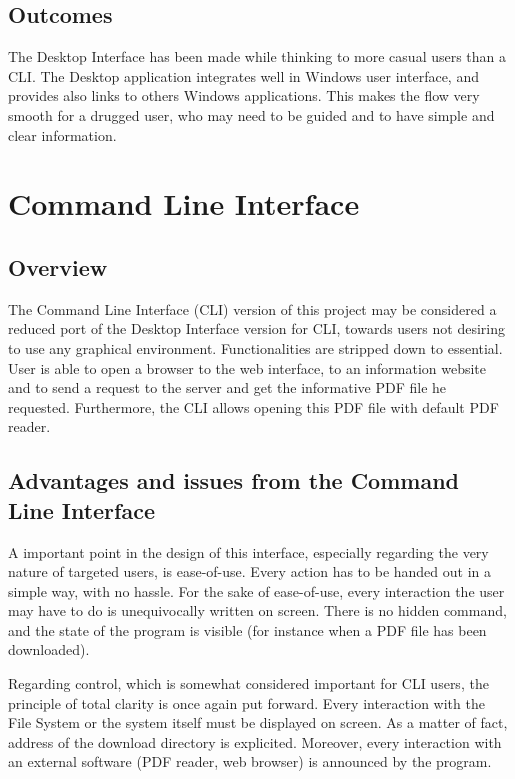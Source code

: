 \documentclass[a4paper,12pt, twocolumn]{article}
\begin{document}
\subsection*{Outcomes}
The Desktop Interface has been made while thinking to more casual users than a CLI. The Desktop application integrates well in Windows user interface, and provides also links to others Windows applications. This makes the flow very smooth for a drugged user, who may need to be guided and to have simple and clear information.\\



\section*{Command Line Interface}\label{cli}

\subsection*{Overview}

The Command Line Interface (CLI) version of this project may be considered a reduced port of the Desktop Interface version for CLI, towards users not desiring to use any graphical environment. Functionalities are stripped down to essential. User is able to open a browser to the web interface, to an information website and to send a request to the server and get the informative PDF file he requested. Furthermore, the CLI allows opening this PDF file with default PDF reader.

\subsection*{Advantages and issues from the Command Line Interface}

A important point in the design of this interface, especially regarding the very nature of targeted users, is ease-of-use. Every action has to be handed out in a simple way, with no hassle. For the sake of ease-of-use, every interaction the user may have to do is unequivocally written on screen. There is no hidden command, and the state of the program is visible (for instance when a PDF file has been downloaded).

Regarding control, which is somewhat considered important for CLI users, the principle of total clarity is once again put forward. Every interaction with the File System or the system itself must be displayed on screen. As a matter of fact, address of the download directory is explicited. Moreover, every interaction with an external software (PDF reader, web browser) is announced by the program.
\end{document}
